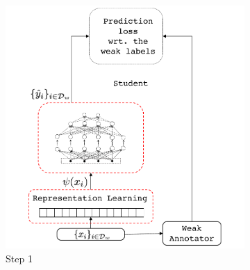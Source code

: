 \begin{figure}[!htbp]%
    \centering
    \begin{subfigure}[t]{0.6006\textwidth}
        \centering
        \includegraphics[width=\textwidth]{03-part-02/chapter-05/figs_and_tables/fig_fwl_step_1.pdf}
        \caption{\label{fig:step1}Step 1}
    \end{subfigure}%
    ~
    \begin{subfigure}[t]{0.462\textwidth}
        \centering

\end{subfigure}
\end{figure}
